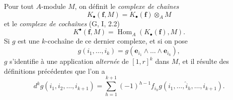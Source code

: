 \begin{env}[1.1.2]
\label{III.1.1.2-fr}
Pour tout $A$-module $M$, on définit le \emph{complexe de chaînes}
\begin{equation}
\label{III.1.1.2.1-fr}
\tag{1.1.2.1}
K_\bullet(\mathbf f,M)=K_\bullet(\mathbf f)\otimes_A M
\end{equation}
et le \emph{complexe de cochaînes} (G, I, 2.2)
\begin{equation}
\label{III.1.1.2.2-fr}
\tag{1.1.2.2}
K^\bullet(\mathbf f,M)=\operatorname{Hom}_A(K_\bullet(\mathbf f),M).
\end{equation}
Si $g$ est une $k$-cochaîne de ce dernier complexe, et si on pose
\[
g(i_1,\ldots,i_k)=g(\mathbf e_{i_1}\wedge\ldots\wedge\mathbf e_{i_k}),
\]
$g$ s'identifie à une application \emph{alternée} de $[1,r]^k$ dans $M$, et
il résulte des définitions précédentes que l'on a
\begin{equation}
\label{III.1.1.2.3-fr}
\tag{1.1.2.3}
d^kg(i_1,i_2,\ldots,i_{k+1})=
\sum_{h=1}^{k+1}(-1)^{h-1}f_{i_h}
g(i_1,\ldots,\widehat{i}_h,\ldots,i_{k+1}).
\end{equation}
\end{env}

